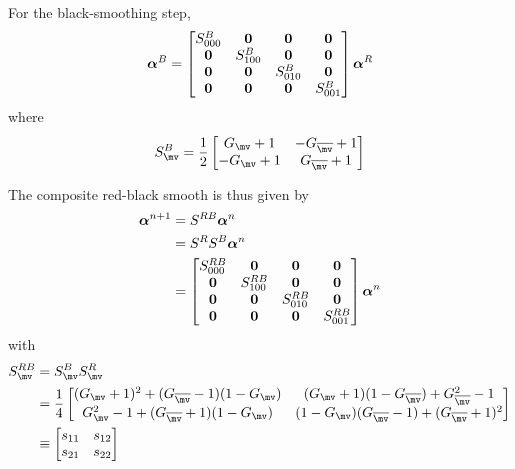 \documentclass[12pt]{article}
\begin{document}
For the black-smoothing step,
\[
  \boldsymbol{\alpha}^B
 = 
  \left[\begin{matrix} S^B_{000} & {\mathbf 0} & {\mathbf 0} &  {\mathbf 0} \\
                        {\mathbf 0} & S^B_{100} & {\mathbf 0} & {\mathbf 0} \\
                        {\mathbf 0} & {\mathbf 0} & S^B_{010} & {\mathbf 0}  \\
                        {\mathbf 0} & {\mathbf 0} & {\mathbf 0} & S^B_{001}  \\
          \end{matrix}\right]
  \boldsymbol{\alpha}^R
\]
where
\[ 
 S^B_\mv = {1\over 2}
   \left[\begin{matrix}
         G_\mv +1 & -G_{\mvb} +1 \\
        -G_\mv +1 &  G_{\mvb} +1 \\
   \end{matrix}\right]
\]

The composite red-black smooth is thus given by
\begin{align*}
  \boldsymbol{\alpha}^{n+1} &= S^{RB} \boldsymbol{\alpha}^n \\
    &= S^R S^B  \boldsymbol{\alpha}^n \\
    &  = 
  \left[\begin{matrix} S^{RB}_{000} & {\mathbf 0} & {\mathbf 0} &  {\mathbf 0} \\
                        {\mathbf 0} & S^{RB}_{100} & {\mathbf 0} & {\mathbf 0} \\
                        {\mathbf 0} & {\mathbf 0} & S^{RB}_{010} & {\mathbf 0}  \\
                        {\mathbf 0} & {\mathbf 0} & {\mathbf 0} & S^{RB}_{001}  \\
          \end{matrix}\right]
  \boldsymbol{\alpha}^n 
\end{align*}
with
\begin{align*}
 S^{RB}_\mv & = S^B_\mv S^R_\mv \\
   &=
  {1\over 4}
   \left[\begin{matrix} 
     (G_\mv+1)^2        + (G_\mvb-1)(1-G_\mv) & (G_\mv+1)(1-G_\mvb) + G_\mvb^2-1 \\
     G_\mv^2-1 + (G_\mvb+1)(1-G_\mv) & (1-G_\mv)(G_\mvb-1) + (G_\mvb+1)^2         \\
   \end{matrix}\right] \\
   &\equiv
     \left[\begin{matrix}
        s_{11} & s_{12} \\
        s_{21} & s_{22} 
     \end{matrix}\right]
\end{align*}
\end{document}
